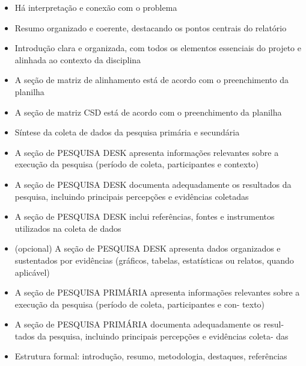\documentclass[
  sigconf,
  nonacm, %
  language=portuguese
]{acmart}
\begin{document}
\begin{itemize}[leftmargin=14pt,itemsep=1pt,topsep=3pt,parsep=0pt]
  \item[\textcolor{cgood}{$\checkmark$}] {\small\textcolor{cgood}{Há interpretação e conexão com o problema}}
  \item[\textcolor{cgood}{$\checkmark$}] {\small\textcolor{cgood}{Resumo organizado e coerente, destacando os pontos centrais do relatório}}
  \item[\textcolor{cgood}{$\checkmark$}] {\small\textcolor{cgood}{Introdução clara e organizada, com todos os elementos essenciais do projeto e alinhada ao contexto da disciplina}}
  \item[$\square$] {\small\textcolor{cmuted}{A seção de matriz de alinhamento está de acordo com o preenchimento da planilha}}
  \item[$\square$] {\small\textcolor{cmuted}{A seção de matriz CSD está de acordo com o preenchimento da planilha}}
  \item[\textcolor{cgood}{$\checkmark$}] {\small\textcolor{cgood}{Síntese da coleta de dados da pesquisa primária e secundária}}
  \item[\textcolor{cgood}{$\checkmark$}] {\small\textcolor{cgood}{A seção de PESQUISA DESK apresenta informações relevantes sobre a execução da pesquisa (período de coleta, participantes e contexto)}}
  \item[\textcolor{cgood}{$\checkmark$}] {\small\textcolor{cgood}{A seção de PESQUISA DESK documenta adequadamente os resultados da pesquisa, incluindo principais percepções e evidências coletadas}}
  \item[\textcolor{cgood}{$\checkmark$}] {\small\textcolor{cgood}{A seção de PESQUISA DESK inclui referências, fontes e instrumentos utilizados na coleta de dados}}
  \item[$\square$] {\small\textcolor{cmuted}{(opcional) A seção de PESQUISA DESK apresenta dados organizados e sustentados por evidências (gráficos, tabelas, estatísticas ou relatos, quando aplicável)}}
  \item[$\square$] {\small\textcolor{cmuted}{A seção de PESQUISA PRIMÁRIA apresenta informações relevantes  sobre a execução da pesquisa (período de coleta, participantes e con- texto)}}
  \item[$\square$] {\small\textcolor{cmuted}{A seção de PESQUISA PRIMÁRIA documenta adequadamente os resul- tados da pesquisa, incluindo principais percepções e evidências coleta- das}}
  \item[\textcolor{cgood}{$\checkmark$}] {\small\textcolor{cgood}{Estrutura formal: introdução, resumo, metodologia, destaques, referências}}

\end{itemize}
\end{document}
